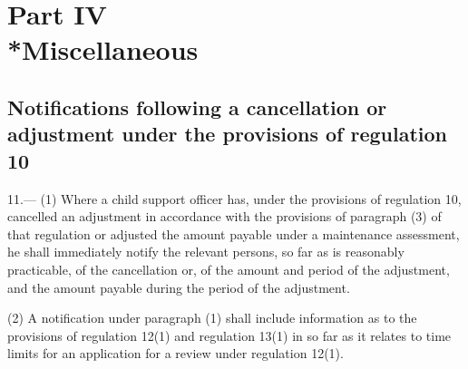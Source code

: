 \documentclass[12pt,a4paper]{article}
\begin{document}

\section[Part IV --- Miscellaneous]{Part IV\\*Miscellaneous}

\renewcommand\parthead{--- Part IV}

\subsection[11. Notifications following a cancellation or adjustment under the provisions of regulation 10]{Notifications following a cancellation or adjustment under the provisions of regulation 10}

11.—%
(1) Where a child support officer has, under the provisions of regulation 10, cancelled an adjustment in accordance with the provisions of paragraph (3) of that regulation or adjusted the amount payable under a maintenance assessment, he shall immediately notify the relevant persons, so far as is reasonably practicable, of the cancellation or, of the amount and period of the adjustment, and the amount payable during the period of the adjustment.

(2) A notification under paragraph (1) shall include information as to the provisions of regulation 12(1) and regulation 13(1) in so far as it relates to time limits for an application for a review under regulation 12(1).
\end{document}
